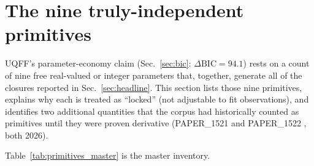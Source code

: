 
\section{The nine truly-independent primitives}
\label{sec:primitives}

UQFF's parameter-economy claim
(Sec.~\ref{sec:bic}: $\Delta\mathrm{BIC} = 94.1$) rests on a count of
nine free real-valued or integer parameters that, together, generate
all of the closures reported in Sec.~\ref{sec:headline}. This
section lists those nine primitives, explains why each is treated as
``locked'' (not adjustable to fit observations), and identifies
two additional quantities that the corpus had historically counted
as primitives until they were proven derivative
(PAPER\_1521 \cite{Murphy_PAPER_1521} and PAPER\_1522
\cite{Murphy_PAPER_1522}, both 2026).

Table~\ref{tab:primitives_master} is the master inventory.

